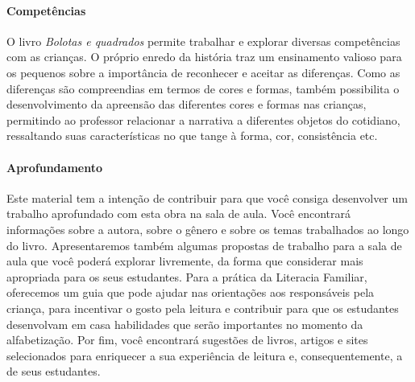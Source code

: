 \documentclass[11pt]{extarticle}
\begin{document}
\paragraph{Competências}
O livro \textit{Bolotas e quadrados} permite trabalhar e explorar diversas competências com as crianças. O próprio enredo da história traz um ensinamento valioso para os pequenos sobre a importância de reconhecer e aceitar as diferenças. Como as diferenças são compreendias em termos de cores e formas, também possibilita o desenvolvimento da apreensão das diferentes cores e formas nas crianças, permitindo ao professor relacionar a narrativa a diferentes objetos do cotidiano, ressaltando suas características no que tange à forma, cor, consistência etc.




\paragraph{Aprofundamento} Este material tem a 
intenção de contribuir para que você consiga desenvolver um trabalho aprofundado 
com esta obra na sala de aula. Você encontrará informações sobre a autora, sobre 
o gênero e sobre os temas trabalhados ao longo do livro. Apresentaremos também 
algumas propostas de trabalho para a sala de aula que você poderá explorar livremente, 
da forma que considerar mais apropriada para os seus estudantes. Para a prática 
da Literacia Familiar, oferecemos um guia que pode ajudar nas orientações aos 
responsáveis pela criança, para incentivar o gosto pela leitura e contribuir para 
que os estudantes desenvolvam em casa habilidades que serão importantes no momento 
da alfabetização. Por fim, você encontrará sugestões de livros, artigos e sites 
selecionados para enriquecer a sua experiência de leitura e, 
consequentemente, a de seus estudantes.

\reversemarginpar
\marginparwidth=5cm
\end{document}
